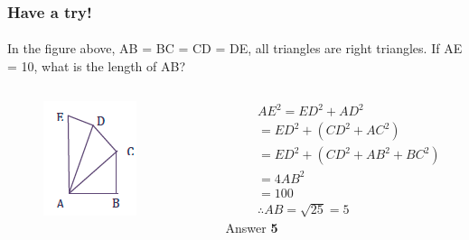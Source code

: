 \documentclass[
	11pt, %
]{beamer}
\begin{document}
\begin{frame}
	\frametitle{Have a try!}
	\framesubtitle{}
In the figure above, AB = BC = CD = DE, all triangles are right triangles. If AE = 10,
what is the length of AB?\\

	\begin{columns}[t] 
		\begin{column}{0.4\textwidth} %
			\begin{figure}
		\includegraphics[width=\linewidth]{Right_Triangle_Example_Question2.png}
	\end{figure}	
		\end{column}
		\begin{column}{0.55\textwidth} %
		\pause
		\begin{equation*}
			\begin{aligned}
				&AE^2= ED^2 + AD^2 \\
				&= ED^2 + (CD^2 + AC^2)\\
				&= ED^2 + (CD^2 + AB^2 + BC^2)\\
				&= 4AB^2 \\
				&= 100\\
				&\therefore AB = \sqrt{25} =5
			\end{aligned}
		\end{equation*}
		\bigskip
		Answer \textbf{5}
		\end{column}
	\end{columns}


\end{frame}
\end{document}
